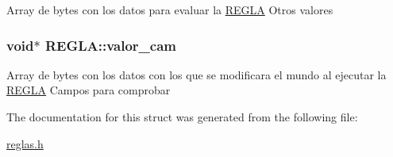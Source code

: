 \label{structREGLA_ab25ddb664e80c62a9025cbcbc9f0c03c}
Array de bytes con los datos para evaluar la \hyperlink{structREGLA}{REGLA} Otros valores \hypertarget{structREGLA_a980484a60eaa5dd30bbc934c6b7a79cc}{
\subsubsection[{valor\_\-cam}]{\setlength{\rightskip}{0pt plus 5cm}void$\ast$ {\bf REGLA::valor\_\-cam}}}
\label{structREGLA_a980484a60eaa5dd30bbc934c6b7a79cc}
Array de bytes con los datos con los que se modificara el mundo al ejecutar la \hyperlink{structREGLA}{REGLA} Campos para comprobar 

The documentation for this struct was generated from the following file:\begin{DoxyCompactItemize}
\item 
\hyperlink{reglas_8h}{reglas.h}\end{DoxyCompactItemize}
